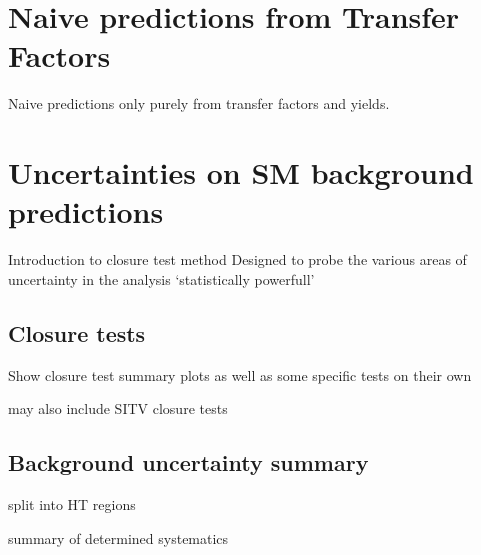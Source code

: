 \section{Naive predictions from Transfer Factors}  %
\label{sec:background_predictions}
Naive predictions only purely from transfer factors and yields.


\section{Uncertainties on SM background predictions}  %
\label{sec:background_systematics}

Introduction to closure test method
Designed to probe the various areas of uncertainty in the analysis
`statistically powerfull'

\subsection{Closure tests}
Show closure test summary plots as well as some specific tests on their own

may also include SITV closure tests

\subsection{Background uncertainty summary}
split into HT regions

summary of determined systematics
